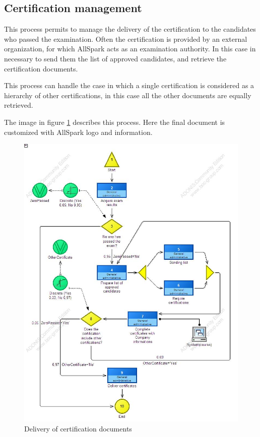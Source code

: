 \subsection{Certification management}
This process permits to manage the delivery of the certification to the
candidates who passed the examination. Often the certification is provided
by an external organization, for which AllSpark acts as an examination
authority. In this case in necessary to send them the list of approved
candidates, and retrieve the certification documents.

This process can handle the case in which a single certification is
considered as a hierarchy of other certifications, in this case all the
other documents are equally retrieved.

The image in figure \ref{2img:certification} describes this process. Here
the final document is customized with AllSpark logo and information.

\begin{figure}[!ht]
\centering
\includegraphics[scale=0.55]{assign2/adonis/imgs/certification.jpg}
\caption{Delivery of certification documents}
\label{2img:certification}
\end{figure}




